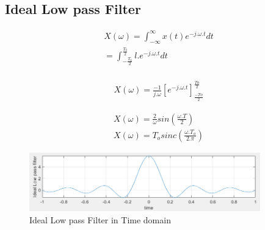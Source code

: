 \documentclass{article}
\begin{document}
\subsection{Ideal Low pass Filter}

\begin{equation}
\begin{aligned}
    X(\omega) = \int_{-\infty}^{\infty} x(t) e^{-j.\omega.t} dt \\
    = \int_{-\frac{T_0}{2}}^{\frac{T_0}{2}} l.e^{-j.\omega.t} dt \\
\end{aligned}
\end{equation}

\begin{equation}
\begin{aligned}
    X(\omega) = \frac{-1}{j.\omega} \left[e^{-j.\omega.t}\right]_{\frac{-To}{2}}^{\frac{To}{2}}
\end{aligned}
\end{equation}

\begin{equation}
\begin{aligned}
    X(\omega) = \frac{2}{\omega} sin(\frac{\omega.T}{2}) \\
    X(\omega) = T_o sinc(\frac{\omega.T_o}{2.\pi})
\end{aligned}
\end{equation}

    \begin{figure}[htbp]
        \begin{center}
    	\includegraphics[width=100mm]{figures/sinc.PNG}
        \end{center}
        \caption{Ideal Low pass Filter in Time domain}
    \end{figure}
    
\end{document}

